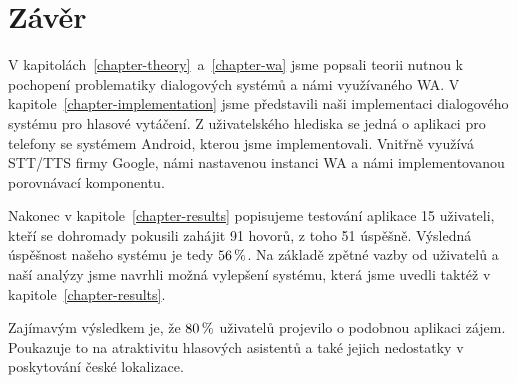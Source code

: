 \chapter*{Závěr}

V kapitolách~\ref{chapter-theory}~a~\ref{chapter-wa} jsme popsali teorii nutnou
k pochopení problematiky dialogových systémů a námi využívaného WA.
V kapitole~\ref{chapter-implementation} jsme představili naši
implementaci dialogového systému pro hlasové vytáčení.
Z uživatelského hlediska se jedná o aplikaci pro telefony se
systémem Android, kterou jsme implementovali. Vnitřně využívá STT/TTS
firmy Google, námi nastavenou instanci WA a námi implementovanou porovnávací
komponentu.

Nakonec v kapitole~\ref{chapter-results} popisujeme testování
aplikace 15 uživateli, kteří se dohromady pokusili zahájit 91 hovorů,
z toho 51 úspěšně. Výsledná úspěšnost našeho systému je tedy \(56\,\rm \%\).
Na základě zpětné vazby od uživatelů a naší analýzy jsme navrhli možná
vylepšení systému, která jsme uvedli taktéž v kapitole~\ref{chapter-results}.

Zajímavým výsledkem je, že \(80\,\rm \%\) uživatelů projevilo o podobnou
aplikaci zájem. Poukazuje to na atraktivitu hlasových asistentů
a také jejich nedostatky v poskytování české lokalizace.